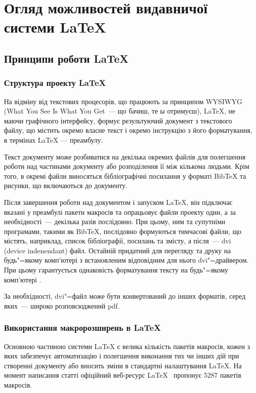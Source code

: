 \chapter{Огляд можливостей видавничої системи \LaTeX{} } 
\label{chapter:first}

\section{Принципи роботи \LaTeX{}}

\subsection{Структура проекту \LaTeX{}}

На відміну від текстових процесорів, що працюють за принципом {WYSIWYG} (What You See Is What You Get~--- що бачиш, те ы отримуєш), \LaTeX{}, не маючи графічного інтерфейсу, формує результуючий документ з текстового файлу, що містить окремо власне текст і окремо інструкцію з його форматування, в термінах \LaTeX{} --- преамбулу.

Текст документу може розбиватися на декілька окремих файлів для полегшення роботи над частинами документу або розподілення її між кількома людьми. Крім того, в окремі файли виносяться бібліографічні посилання у форматі BibTeX та рисунки, що включаються до документу. 

Після завершення роботи над документом і запуском \LaTeX{}, він підключає вказані у преамбулі пакети макросів та опрацьовує файли проекту один, а за необхідності~--- декілька разів послідовно. При цьому, ним та супутніми програмами, такими як BibTeX, послідовно формуються тимчасові файли, що містять, наприклад, список бібліографії, посилань та змісту, а після~--- dvi (device indenendant) файл. Остайній придатний для перегляду та друку на будь"=якому комп'ютері з встановленим відповідним для нього dvi"=драйвером. При цьому гарантується однаковість форматування тексту на будь"=якому комп'ютері \cite[с.~16]{Lvovskii2010NaborVerstka}.

За необхідності, dvi"=файл може бути конвертований до інших форматів, серед яких~--- широко розповсюджений pdf.

\subsection{Використання макророзширень в \LaTeX{}}

Основною частиною системи LaTeX є велика кількість пакетів макросів, кожен з яких забезпечує автоматизацію і полегшення виконання тих чи інших дій при створенні документу або вносить зміни в стандартні налаштування \LaTeX{}. На момент написання статті офіційний веб-ресурс LaTeX~\cite{www:ctan} пропонує 5287 пакетів макросів. 

